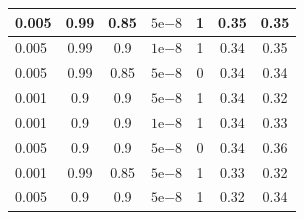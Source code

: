 \begin{table}[]
\begin{tabular}{lcccc|cc|}
\multicolumn{1}{|l|}{0.005}                         & \multicolumn{1}{c|}{0.99}                        & \multicolumn{1}{c|}{0.85}                         & \multicolumn{1}{c|}{$5\mathrm{e}{-8}$}                         & 1       & \multicolumn{1}{c|}{0.35}                         & 0.35    \\ \hline
\multicolumn{1}{|l|}{0.005}                         & \multicolumn{1}{c|}{0.99}                        & \multicolumn{1}{c|}{0.9}                          & \multicolumn{1}{c|}{$1\mathrm{e}{-8}$}                         & 1       & \multicolumn{1}{c|}{0.34}                         & 0.35    \\ \hline
\multicolumn{1}{|l|}{0.005}                         & \multicolumn{1}{c|}{0.99}                        & \multicolumn{1}{c|}{0.85}                         & \multicolumn{1}{c|}{$5\mathrm{e}{-8}$}                         & 0       & \multicolumn{1}{c|}{0.34}                         & 0.34    \\ \hline
\multicolumn{1}{|l|}{0.001}                         & \multicolumn{1}{c|}{0.9}                         & \multicolumn{1}{c|}{0.9}                          & \multicolumn{1}{c|}{$5\mathrm{e}{-8}$}                         & 1       & \multicolumn{1}{c|}{0.34}                         & 0.32    \\ \hline
\multicolumn{1}{|l|}{0.001}                         & \multicolumn{1}{c|}{0.9}                         & \multicolumn{1}{c|}{0.9}                          & \multicolumn{1}{c|}{$1\mathrm{e}{-8}$}                         & 1       & \multicolumn{1}{c|}{0.34}                         & 0.33    \\ \hline
\multicolumn{1}{|l|}{0.005}                         & \multicolumn{1}{c|}{0.9}                         & \multicolumn{1}{c|}{0.9}                          & \multicolumn{1}{c|}{$5\mathrm{e}{-8}$}                         & 0       & \multicolumn{1}{c|}{0.34}                         & 0.36    \\ \hline
\multicolumn{1}{|l|}{0.001}                         & \multicolumn{1}{c|}{0.99}                        & \multicolumn{1}{c|}{0.85}                         & \multicolumn{1}{c|}{$5\mathrm{e}{-8}$}                         & 1       & \multicolumn{1}{c|}{0.33}                         & 0.32    \\ \hline
\multicolumn{1}{|l|}{0.005}                         & \multicolumn{1}{c|}{0.9}                         & \multicolumn{1}{c|}{0.9}                          & \multicolumn{1}{c|}{$5\mathrm{e}{-8}$}                         & 1       & \multicolumn{1}{c|}{0.32}                         & 0.34    \\ \hline

\end{tabular}
\end{table}
